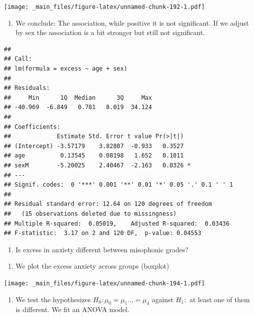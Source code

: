 \documentclass[
]{book}
\providecommand{\tightlist}{%
  \setlength{\itemsep}{0pt}\setlength{\parskip}{0pt}}
\begin{document}
\texttt{[image: \_main\_files/figure-latex/unnamed-chunk-192-1.pdf]}

\begin{enumerate}
\def\labelenumi{\alph{enumi}.}
\setcounter{enumi}{2}
\tightlist
\item
  We conclude: The association, while positive it is not significant. If we adjust by sex the association is a bit stronger but still not significant.
\end{enumerate}

\begin{verbatim}
## 
## Call:
## lm(formula = excess ~ age + sex)
## 
## Residuals:
##     Min      1Q  Median      3Q     Max 
## -40.969  -6.849   0.781   8.019  34.124 
## 
## Coefficients:
##             Estimate Std. Error t value Pr(>|t|)  
## (Intercept) -3.57179    3.82807  -0.933   0.3527  
## age          0.13545    0.08198   1.652   0.1011  
## sexM        -5.20025    2.40467  -2.163   0.0326 *
## ---
## Signif. codes:  0 '***' 0.001 '**' 0.01 '*' 0.05 '.' 0.1 ' ' 1
## 
## Residual standard error: 12.64 on 120 degrees of freedom
##   (15 observations deleted due to missingness)
## Multiple R-squared:  0.05019,    Adjusted R-squared:  0.03436 
## F-statistic:  3.17 on 2 and 120 DF,  p-value: 0.04553
\end{verbatim}

\begin{enumerate}
\def\labelenumi{\arabic{enumi}.}
\setcounter{enumi}{4}
\tightlist
\item
  Is excess in anxiety different between misophonic grades?
\end{enumerate}

\begin{enumerate}
\def\labelenumi{\alph{enumi}.}
\tightlist
\item
  We plot the excess anxiety across groups (boxplot)
\end{enumerate}

\texttt{[image: \_main\_files/figure-latex/unnamed-chunk-194-1.pdf]}

\begin{enumerate}
\def\labelenumi{\alph{enumi}.}
\setcounter{enumi}{1}
\tightlist
\item
  We test the hypothesizes \(H_0: \mu_{0}=\mu_{1} ... =\mu_{4}\) against \(H_1:\) at least one of them is different. We fit an ANOVA model.
\end{enumerate}
\end{document}
